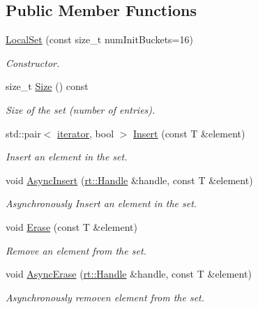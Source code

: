 \subsection*{Public Member Functions}
\begin{DoxyCompactItemize}
\item 
\hyperlink{classshad_1_1LocalSet_a99850024d94cb0737b0e40b5ca9852df}{Local\-Set} (const size\-\_\-t num\-Init\-Buckets=16)
\begin{DoxyCompactList}\small\item\em Constructor. \end{DoxyCompactList}\item 
size\-\_\-t \hyperlink{classshad_1_1LocalSet_a2a83315ad49f8b4b480ebc4ac2f3b332}{Size} () const 
\begin{DoxyCompactList}\small\item\em Size of the set (number of entries). \end{DoxyCompactList}\item 
std\-::pair$<$ \hyperlink{classshad_1_1LocalSet_a90ad05d816b6336fea56e6511093d4f6}{iterator}, bool $>$ \hyperlink{classshad_1_1LocalSet_a66da6676f1ef1692b237c52271a3b4df}{Insert} (const T \&element)
\begin{DoxyCompactList}\small\item\em Insert an element in the set. \end{DoxyCompactList}\item 
void \hyperlink{classshad_1_1LocalSet_a44073e097981a573ab59c6eb94c9fce6}{Async\-Insert} (\hyperlink{classshad_1_1rt_1_1Handle}{rt\-::\-Handle} \&handle, const T \&element)
\begin{DoxyCompactList}\small\item\em Asynchronously Insert an element in the set. \end{DoxyCompactList}\item 
void \hyperlink{classshad_1_1LocalSet_a4c97e21c48ee656819f08162c05b0479}{Erase} (const T \&element)
\begin{DoxyCompactList}\small\item\em Remove an element from the set. \end{DoxyCompactList}\item 
void \hyperlink{classshad_1_1LocalSet_ab8f41a8bca2ae9c2febb97ab01e63579}{Async\-Erase} (\hyperlink{classshad_1_1rt_1_1Handle}{rt\-::\-Handle} \&handle, const T \&element)
\begin{DoxyCompactList}\small\item\em Asynchronously removen element from the set. \end{DoxyCompactList}\item 

\end{DoxyCompactItemize}
